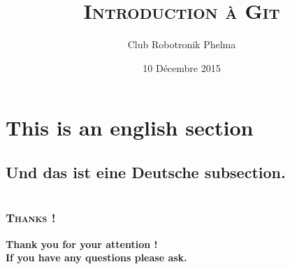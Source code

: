 \documentclass[10pt,a9paper,handout]{beamer}
\title{\textsc{Introduction à Git}}
\author{Club Robotronik Phelma}
\date{10 Décembre 2015}
\begin{document}
\setcounter{tocdepth}{1}
\begin{frame} \titlepage       \end{frame}
\begin{frame} \tableofcontents \end{frame}

\section{This is an english section}
\subsection{Und das ist eine Deutsche subsection.}
\begin{frame}

\end{frame}

\section{}
\subsection{}
\begin{frame}
\end{frame}

\section{}
\subsection{}
\begin{frame}

\end{frame}

\section{}
\subsection{}
\begin{frame}
\end{frame}


\begin{frame}
    \frametitle{\textsc{Thanks !}}
    \begin{center}
    \Large \textbf{Thank you for your attention !\\If you have any questions please ask.}
    \end{center}
\end{frame}
\end{document}
